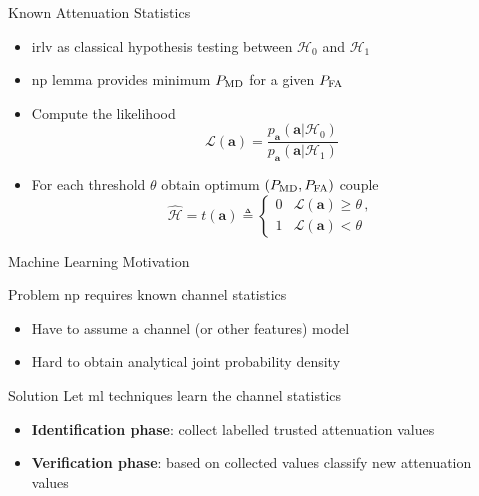 \documentclass[10pt]{beamer}
\begin{document}
\begin{frame}{Known Attenuation Statistics}
\begin{itemize}
	\item \ac{irlv} as classical hypothesis testing between $\mathcal{H}_0$ and $\mathcal{H}_1$
	\item \ac{np} lemma provides minimum $P_{\rm MD}$ for a given $P_{\rm FA}$
	\item Compute the likelihood
	\begin{equation*}
	\mathcal{L}{(\bm a)}=\frac{p_{\bm a}(\bm a|\mathcal{H}_0)}{p_{\bm a}(\bm a|\mathcal{H}_1)}
	\end{equation*}
	\item For each threshold $\theta$ obtain optimum $(P_{\rm MD}, P_{\rm FA})$ couple
	\begin{equation*}
	\hat{\mathcal{H}} = t(\bm a) \triangleq \begin{cases}
	0 & \mathcal{L}{(\bm a)} \geq \theta\,, \\ 
	1 & \mathcal{L}{(\bm a)} < \theta 
	\end{cases}
	\end{equation*}
\end{itemize}
\end{frame}
\begin{frame}{Machine Learning Motivation}
	\begin{block}{Problem}
		\ac{np} requires known channel statistics
	\end{block}

\begin{itemize}
	\item Have to assume a channel (or  other features) model
	\item Hard to obtain analytical joint probability density  
\end{itemize}

\begin{block}{Solution}
	Let \ac{ml} techniques learn the channel statistics
\end{block}
\begin{itemize}
	\item \textbf{Identification phase}: collect labelled trusted attenuation values
	\item \textbf{Verification phase}: based on collected values classify new attenuation values
\end{itemize}
\end{frame}
\end{document}

